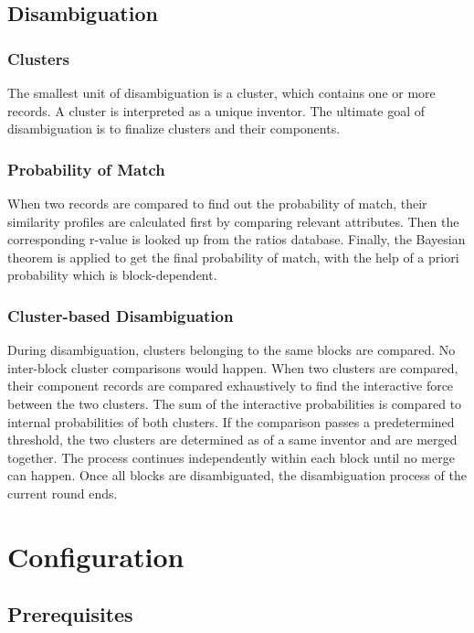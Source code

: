 \documentclass{article}
\begin{document}
\subsection{Disambiguation}


\subsubsection{Clusters}

The smallest unit of disambiguation is a cluster, 
which contains one or more records. A cluster is
interpreted as a unique inventor. The ultimate 
goal of disambiguation is to finalize clusters 
and their components.


\subsubsection{Probability of Match}

When two records are compared to find out the probability 
of match, their similarity profiles are calculated first 
by comparing relevant attributes. Then the corresponding 
r-value is looked up from the ratios database. Finally, the 
Bayesian theorem is applied to get the final probability 
of match, with the help of a priori probability which 
is block-dependent.



\subsubsection{Cluster-based Disambiguation}

During disambiguation, clusters belonging to the same 
blocks are compared. No inter-block cluster comparisons 
would happen. When two clusters are compared, their 
component records are compared exhaustively to find the 
interactive force between the two clusters. The sum of 
the interactive probabilities is compared to internal 
probabilities of both clusters. If the comparison passes a
predetermined threshold, the two clusters are determined 
as of a same inventor and are merged together. The process 
continues independently within each block until no merge 
can happen. Once all blocks are disambiguated, the 
disambiguation process of the current round ends.


\section{Configuration}


\subsection{Prerequisites}
\end{document}
